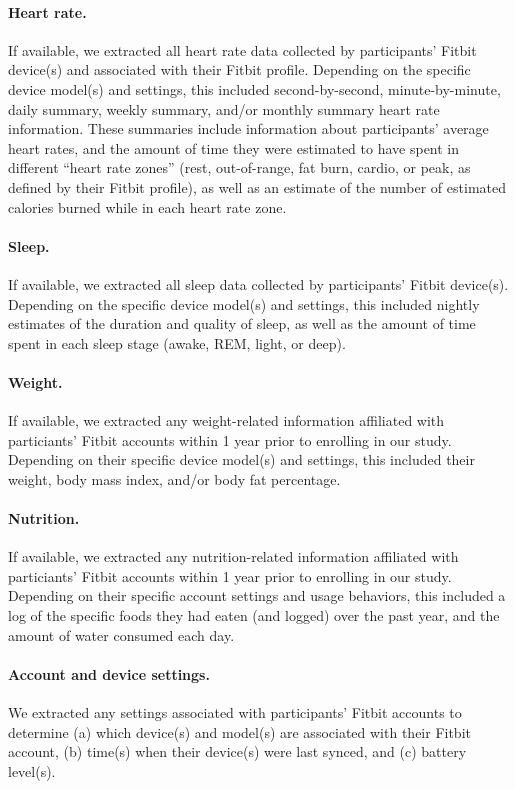 \documentclass[10pt]{article}
\begin{document}
\paragraph{Heart rate.}  If available, we extracted all
heart rate data collected by participants' Fitbit device(s) and associated with
their Fitbit profile.  Depending on the specific device model(s) and
settings, this included second-by-second, minute-by-minute, daily
summary, weekly summary, and/or monthly summary heart rate
information.  These summaries include information about participants' average
heart rates, and the amount of time they were estimated to have spent in
different ``heart rate zones'' (rest, out-of-range, fat burn, cardio, or
peak, as defined by their Fitbit profile), as well as an estimate of the number of estimated calories
burned while in each heart rate zone.

\paragraph{Sleep.}  If available, we extracted all sleep data collected
by participants' Fitbit device(s).  Depending on the specific device
model(s) and settings, this included nightly estimates of the duration
and quality of sleep, as well as the amount of time spent in each
sleep stage (awake, REM, light, or deep).

\paragraph{Weight.}  If available, we extracted any weight-related
information affiliated with particiants' Fitbit accounts within 1 year
prior to enrolling in our study.  Depending on their specific device model(s) and
settings, this included their weight, body mass index, and/or body fat
percentage.

\paragraph{Nutrition.} If available, we extracted any nutrition-related
information affiliated with particiants' Fitbit accounts within 1 year
prior to enrolling in our study. Depending on their specific account
settings and usage behaviors, this
included a log of the specific foods they had eaten (and logged)
over the past year, and the amount of water consumed each day.

\paragraph{Account and device settings.}  We extracted any settings
associated with participants' Fitbit accounts to determine (a) which
device(s) and model(s) are associated with their Fitbit account, (b)
time(s) when their device(s) were last synced, and (c) battery
level(s).
\end{document}
